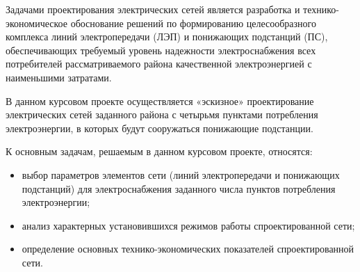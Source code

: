 \Introduction

Задачами проектирования электрических сетей является разработка и технико-экономическое обоснование решений по формированию целесообразного комплекса линий электропередачи (ЛЭП) и понижающих подстанций (ПС), обеспечивающих требуемый уровень надежности электроснабжения всех потребителей рассматриваемого района качественной электроэнергией с наименьшими затратами.

В данном курсовом проекте осуществляется «эскизное» проектирование электрических сетей заданного района с четырьмя пунктами потребления электроэнергии, в которых будут сооружаться понижающие подстанции.

К основным задачам, решаемым в данном курсовом проекте, относятся:
\begin{itemize}
\item выбор параметров элементов сети (линий электропередачи и понижающих подстанций) для электроснабжения заданного числа пунктов потребления электроэнергии;
\item анализ характерных установившихся режимов работы спроектированной сети;
\item определение основных технико-экономических показателей спроектированной сети.
\end{itemize}
